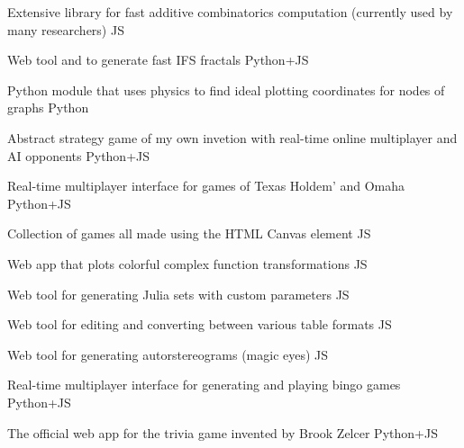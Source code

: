 

\begin{cvprojects}
  
  \cvproject
  {}
  {Extensive library for fast additive combinatorics computation (currently used by many researchers)}
  {JS}

  \cvproject
  {}
  {Web tool and  to generate fast IFS fractals}
  {Python+JS}

  \cvproject
  {}
  {Python module that uses physics to find ideal plotting coordinates for nodes of graphs}
  {Python}

  \cvproject
  {}
  {Abstract strategy game of my own invetion with real-time online multiplayer and AI opponents}
  {Python+JS}

  \cvproject
  {}
  {Real-time multiplayer interface for games of Texas Holdem' and Omaha}
  {Python+JS}

  \cvproject
  {}
  {Collection of games all made using the HTML Canvas element}
  {JS}

  \cvproject
  {}
  {Web app that plots colorful complex function transformations}
  {JS}

  \cvproject
  {}
  {Web tool for generating Julia sets with custom parameters}
  {JS}
  
  \cvproject
  {}
  {Web tool for editing and converting between various table formats}
  {JS}

  \cvproject
  {}
  {Web tool for generating autorstereograms (magic eyes)}
  {JS}

  \cvproject
  {}
  {Real-time multiplayer interface for generating and playing bingo games}
  {Python+JS}

  \cvproject
  {}
  {The official web app for the trivia game invented by Brook Zelcer}
  {Python+JS}



\end{cvprojects}














